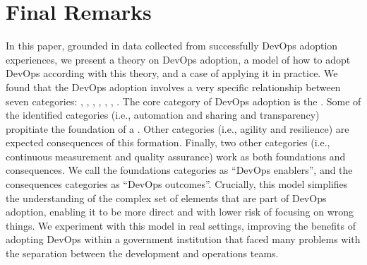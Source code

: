 \section{Final Remarks} \label{sec:conclusion}

In this paper, grounded in data collected from successfully DevOps adoption
experiences, we present a theory on DevOps adoption, a model of how to adopt
DevOps according with this theory, and a case of applying it in practice.
We found that the DevOps adoption involves a very specific relationship between
seven categories: , , \cc, , , , .
The core category of DevOps adoption is the \cc. Some of the
identified categories (i.e., automation and sharing and transparency) propitiate
the foundation of a \cc. Other categories
(i.e., agility and resilience) are expected consequences of this formation.
Finally, two other categories (i.e., continuous measurement and quality
assurance) work as both foundations and consequences. We call the foundations
categories as ``DevOps enablers'', and the consequences categories as ``DevOps outcomes''.
Crucially, this model simplifies the understanding of the
complex set of elements that are part of DevOps adoption, enabling it to be
more direct and with lower risk of focusing on wrong things. We experiment with 
this model in real settings, improving the benefits of adopting DevOps 
within a government institution that faced many problems with the separation between the 
development and operations teams. 

